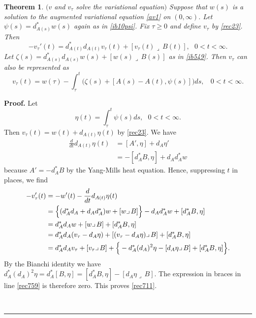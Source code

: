 \documentclass[12pt]{article}
\newtheorem{theorem}{Theorem}[section]
\newenvironment{proof}[1][Proof]{\textbf{#1.} }{\ \rule{0.5em}{0.5em}}
\def \beq{\begin{equation}}
\def \eeq{\end{equation}}
\def \eref{\eqref}
\def \lrc{\lrcorner\,}
\numberwithin{equation}{section}
\begin{document}
\begin{theorem} \label{thmrec5}  
 $($$v$ and $v_\tau$ solve the variational equation$)$ 
Suppose that $w(s)$ is a solution to the augmented variational equation \eref{av1} on $(0,  \infty)$.
Let $\psi(s) = d_{A(s)}^* w(s)$ again  as in \eref{ib10psi}. 
Fix $\tau \ge 0$ and define  
$v_\tau$  by \eref{rec23}. Then
\beq
-v_\tau'(t) = d_{A(t)}^* d_{A(t)} v_\tau(t) + [ v_\tau(t)\lrc B(t)], \ \ \ 0 < t <  \infty. 
         \label{rec711}
\eeq
Let $\zeta(s) = d_{A(s)}^* d_{A(s)} w(s) +[w(s)\lrc B(s)]$ as in \eref{ib549}. 
Then  $v_\tau$ can also be represented as  
\beq
v_\tau(t) = w(\tau) - \int_\tau^t \Big( \zeta(s) +[A(s) -A(t), \psi(s)] \Big) ds, \ \ \   \ 0 < t <  \infty.   \label{rec750}
\eeq
\end{theorem} 
      \begin{proof}    
   Let 
   \beq
   \eta(t) = \int_{\tau}^t \psi(s) ds, \ \ \ 0 < t <  \infty. \label{rec758}  
   \eeq	
   Then      
   $v_\tau(t) = w(t) + d_{A(t)}\eta(t)$  by \eref{rec23}. 
   We have   
 \begin{align*}
 \frac{d}{dt} d_{A(t)}\eta(t)  &= [A', \eta] +d_A \eta' \\
 &=  - [d_A^* B, \eta]  + d_Ad_A^* w
 \end{align*}
 because $A' = - d_A^*B$ by the Yang-Mills heat equation.
 Hence, suppressing $t$ in places, we find 
 \begin{align}
 -v_\tau'(t) &= - w'(t) - \frac{d}{dt} d_{A(t)}\eta(t)                                              \notag\\
 &= \Big\{ (d_A^*d_A + d_A d_A^*)w + [w\lrc B]\Big\} - d_A d_A^* w + [d_A^* B, \eta]\notag\\
 & = d_A^*d_A  w +[w\lrc B] +[d_A^* B, \eta]       \notag\\
 &= d_A^*d_A(v_\tau  - d_A\eta)  + [(v_\tau-d_A \eta)\lrc B] + [d_A^* B, \eta]    \notag\\
 & = d_A^* d_A v_\tau +[v_\tau \lrc B] + \Big\{ -d_A^*(d_A)^2\eta - [d_A\eta \lrc B] + [d_A^* B, \eta]  \Big\}.
                                                                                                 \label{rec759}
 \end{align}
 By the Bianchi identity we have 
 $d_A^*(d_A)^2 \eta = d_A^*[B,\eta]
  =[d_A^* B, \eta] - [d_A \eta\lrc B]$.
 The expression in braces  in line \eref{rec759} is  therefore zero.
 This proves \eref{rec711}. 


\end{proof}
\end{document}
